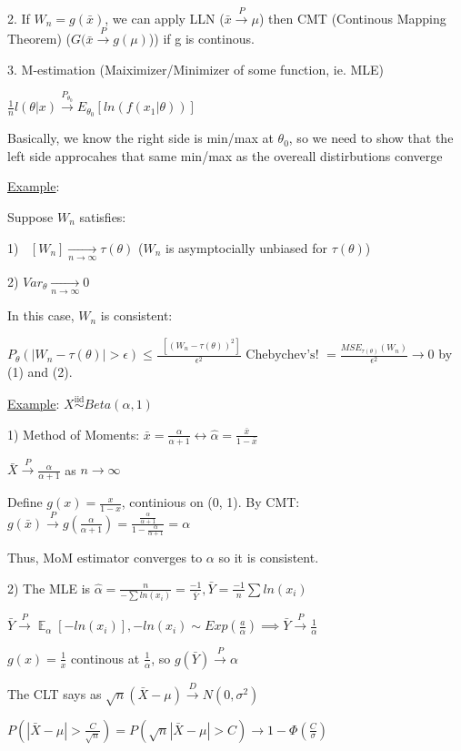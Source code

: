 \documentclass{article}
\DeclareMathOperator{\EX}{\mathbb{E}} %
\DeclareMathOperator{\ext}{\EX_{\theta}} %
\newcommand{\pto}{\overset{P}{\to}}
\newcommand{\dto}{\overset{D}{\to}}
\let\Oldsum=\sum
\renewcommand{\sum}{\Oldsum\limits}
\newcommand{\iiddist}{\overset{\mathrm{iid}}{\sim}}
\begin{document}
2. If $W_n = g(\bar{x})$, we can apply LLN ($\bar{x} \pto \mu$) then CMT (Continous Mapping Theorem) ($G(\bar{x} \pto g(\mu)$)) if g is continous.

3. M-estimation (Maiximizer/Minimizer of some function, ie. MLE)

$\frac{1}{n}l(\theta|x) \overset{P_{\theta_0}}{\to} E_{\theta_0}[ln(f(x_1|\theta))]$

Basically, we know the right side is min/max at $\theta_0$, so we need to show that the left side approcahes that same min/max as the overeall distirbutions converge

\underline{Example}: 

Suppose $W_n$ satisfies: 

1) $\ext[W_n] \underset{n\to\infty}{\to} \tau(\theta)$ ($W_n$ is asymptocially unbiased for $\tau(\theta)$) 

2) $Var_{\theta} \underset{n\to\infty}{\to} 0$

In this case, $W_n$ is consistent: 

$P_{\theta}(|W_n - \tau(\theta)| > \epsilon) \le \frac{\ext[(W_n - \tau(\theta))^2]}{\epsilon^2} \text{ Chebychev's! }= \frac{MSE_{\tau(\theta)}(W_n)}{\epsilon^2} \to 0$ by (1) and (2).

\underline{Example}: $X \iiddist Beta(\alpha, 1)$

1) Method of Moments: $\bar{x} = \frac{\alpha}{\alpha + 1} \leftrightarrow \hat{\alpha} = \frac{\bar{x}}{1 - \bar{x}}$

$\bar{X} \pto \frac{\alpha}{\alpha + 1}$ as $n \to \infty$

Define $g(x) = \frac{x}{1-x}$, continious on (0, 1). By CMT: $g(\bar{x}) \pto g(\frac{\alpha}{\alpha + 1}) = \frac{\frac{\alpha}{\alpha + 1}}{1 - \frac{\alpha}{\alpha + 1}} = \alpha$

Thus, MoM estimator converges to $\alpha$ so it is consistent.

2) The MLE is $\hat{\alpha} = \frac{n}{-\sum ln(x_i)} = \frac{-1}{\bar{Y}}, \bar{Y} = \frac{-1}{n}\sum ln(x_i)$

$\bar{Y} \pto \EX_{\alpha}[-ln(x_i)], -ln(x_i) \sim Exp(\frac{a}{\alpha}) \implies \bar{Y} \pto \frac{1}{\alpha}$

$g(x) = \frac{1}{x}$ continous at $\frac{1}{\alpha}$, so $g(\bar{Y}) \pto \alpha$




The CLT says as $\sqrt{n}(\bar{X} - \mu) \dto N(0, \sigma^2)$ 

$P(|\bar{X} - \mu| > \frac{C}{\sqrt{n}}) = P(\sqrt{n}|\bar{X} - \mu| > C) \to 1 - \Phi(\frac{C}{\sigma})$
\end{document}
